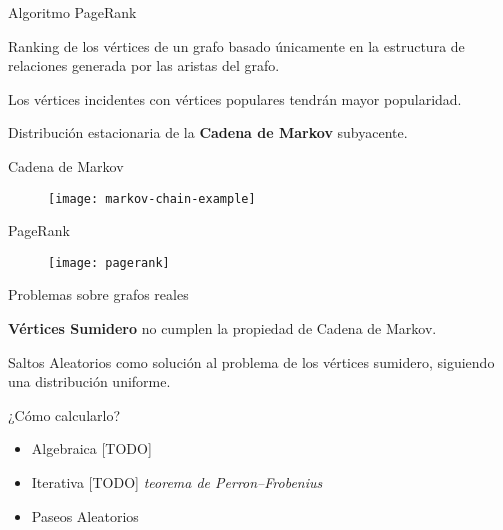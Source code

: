 \documentclass[12pt]{beamer}
\begin{document}
    \begin{frame}[fragile]{Algoritmo PageRank}

      Ranking de los vértices de un grafo basado únicamente en la estructura de relaciones generada por las aristas del grafo.

      Los vértices incidentes con vértices populares tendrán mayor popularidad.

      Distribución estacionaria de la \textbf{Cadena de Markov} subyacente.

    \end{frame}

    \begin{frame}[fragile]{Cadena de Markov}

      \begin{figure}
        \texttt{[image: markov-chain-example]}
        \caption{}
        \label{}
      \end{figure}

    \end{frame}

    \begin{frame}[fragile]{PageRank}

      \begin{figure}
        \texttt{[image: pagerank]}
        \caption{}
        \label{}
      \end{figure}

    \end{frame}

    \begin{frame}[fragile]{Problemas sobre grafos reales}

      \textbf{Vértices Sumidero} no cumplen la propiedad de Cadena de Markov.

      Saltos Aleatorios como solución al problema de los vértices sumidero, siguiendo una distribución uniforme.

    \end{frame}

    \begin{frame}[fragile]{¿Cómo calcularlo?}

      \begin{itemize}
        \item Algebraica [TODO]
        \item Iterativa [TODO] \emph{teorema de Perron–Frobenius}
        \item Paseos Aleatorios
      \end{itemize}

    \end{frame}
\end{document}

